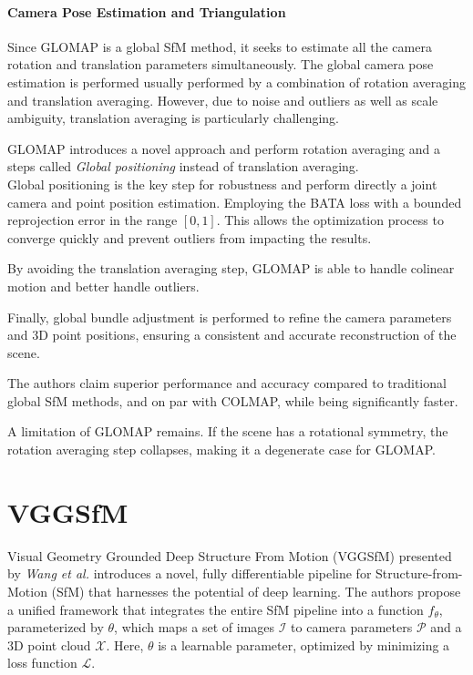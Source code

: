\paragraph{Camera Pose Estimation and Triangulation}
Since GLOMAP is a global SfM method, it seeks to estimate all the camera rotation and translation parameters simultaneously.
The global camera pose estimation is performed usually performed by a combination of rotation averaging and translation averaging. 
However, due to noise and outliers as well as scale ambiguity, translation averaging is particularly challenging.

GLOMAP introduces a novel approach and perform rotation averaging and a steps called \emph{Global positioning} instead of translation averaging. \\
Global positioning is the key step for robustness and perform directly a joint camera and point position estimation. 
Employing the BATA loss \cite{zhuang2019baselinedesensitizingtranslationaveraging} with a bounded reprojection error in the range $[0, 1]$. 
This allows the optimization process to converge quickly and prevent outliers from impacting the results.

By avoiding the translation averaging step, GLOMAP is able to handle colinear motion and better handle outliers.

Finally, global bundle adjustment is performed to refine the camera parameters and 3D point positions, ensuring a consistent and accurate reconstruction of the scene.

The authors claim superior performance and accuracy compared to traditional global SfM methods, and on par with COLMAP, while being significantly faster.

A limitation of GLOMAP remains. If the scene has a rotational symmetry, the rotation averaging step collapses, making it a degenerate case for GLOMAP.

\section{VGGSfM}\label{sec:vggsfm}
Visual Geometry Grounded Deep Structure From Motion (VGGSfM) \cite{wang2023vggsfm} presented by \textit{Wang et al.} introduces a novel, fully differentiable pipeline for Structure-from-Motion (SfM) that harnesses the potential of deep learning. The authors propose a unified framework that integrates the entire SfM pipeline into a function $f_{\theta}$, parameterized by $\theta$, which maps a set of images $\mathcal{I}$ to camera parameters $\mathcal{P}$ and a 3D point cloud $\mathcal{X}$. Here, $\theta$ is a learnable parameter, optimized by minimizing a loss function $\mathcal{L}$.

